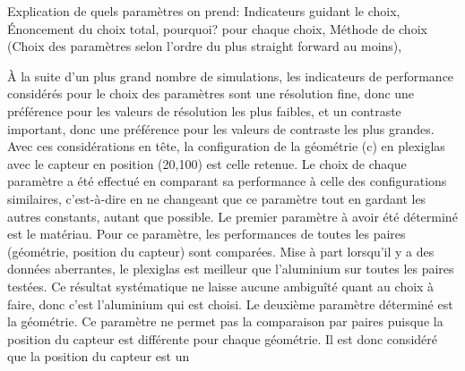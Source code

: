 \documentclass[conference]{IEEEtran}
\begin{document}
Explication de quels paramètres on prend: Indicateurs guidant le choix, Énoncement 
du choix total, pourquoi? pour chaque choix, Méthode de choix (Choix des paramètres
selon l'ordre du plus straight forward au moins), 

À la suite d'un plus grand nombre de simulations, les indicateurs de performance 
considérés pour le choix des paramètres sont une résolution fine, donc une 
préférence pour les valeurs de résolution les plus faibles, et un contraste 
important, donc une préférence pour les valeurs de contraste les plus grandes.
Avec ces considérations en tête, la configuration de la géométrie (c) en plexiglas 
avec le capteur en position (20,100) est celle retenue. Le choix de chaque paramètre
a été effectué en comparant sa performance à celle des configurations similaires, 
c'est-à-dire en ne changeant que ce paramètre tout en gardant les autres constants,
autant que possible.
Le premier paramètre à avoir été déterminé est le matériau. Pour ce paramètre, 
les performances de toutes les paires (géométrie, position du capteur) sont 
comparées. Mise à part lorsqu'il y a des données aberrantes, le plexiglas est 
meilleur que l'aluminium sur toutes les paires testées. Ce résultat systématique 
ne laisse aucune ambiguîté quant au choix à faire, donc c'est l'aluminium qui est 
choisi.
Le deuxième paramètre déterminé est la géométrie. Ce paramètre ne permet pas la 
comparaison par paires puisque la position du capteur est différente pour chaque 
géométrie. Il est donc considéré que la position du capteur est un 




\clearpage

% 
% 
\end{document}
